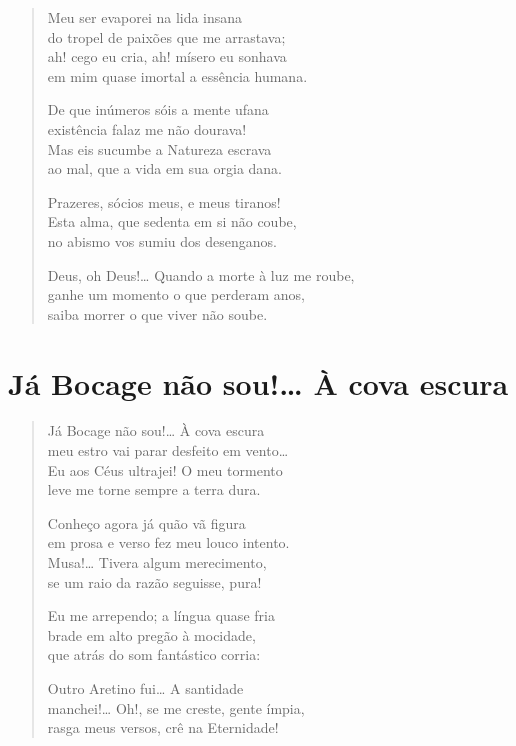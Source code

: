 \documentclass[10pt,a5paper,oneside]{book}
\begin{document}
\begin{verse}
Meu ser evaporei na lida insana\\
do tropel de paixões que me arrastava;\\
ah! cego eu cria, ah! mísero eu sonhava\\
em mim quase imortal a essência humana.

De que inúmeros sóis a mente ufana\\
existência falaz me não dourava!\\
Mas eis sucumbe a Natureza escrava\\
ao mal, que a vida em sua orgia dana.

Prazeres, sócios meus, e meus tiranos!\\
Esta alma, que sedenta em si não coube,\\
no abismo vos sumiu dos desenganos.

Deus, oh Deus!\ldots{} Quando a morte à luz me roube,\\
ganhe um momento o que perderam anos,\\
saiba morrer o que viver não soube.
\end{verse}

\chapter{Já Bocage não sou!\ldots{} À cova escura}

\begin{verse}
Já Bocage não sou!\ldots{} À cova escura\\
meu estro vai parar desfeito em vento\ldots{}\\
Eu aos Céus ultrajei! O meu tormento\\
leve me torne sempre a terra dura.

Conheço agora já quão vã figura\\
em prosa e verso fez meu louco intento.\\
Musa!\ldots{} Tivera algum merecimento,\\
se um raio da razão seguisse, pura!

Eu me arrependo; a língua quase fria\\
brade em alto pregão à mocidade,\\
que atrás do som fantástico corria:

Outro Aretino fui\ldots{} A santidade\\
manchei!\ldots{} Oh!, se me creste, gente ímpia,\\
rasga meus versos, crê na Eternidade!
\end{verse}
\end{document}
